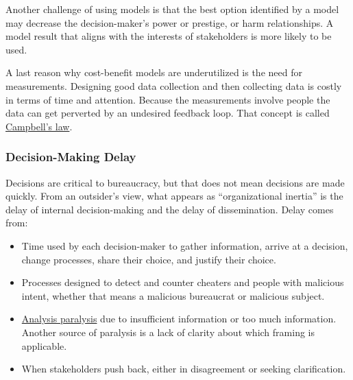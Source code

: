 Another challenge of using models is that the best option identified by a model may decrease the decision-maker's power or prestige, or harm relationships. A model result that aligns with the interests of stakeholders is more likely to be used.

A last reason why cost-benefit models are underutilized is the need for measurements. Designing good data collection and then collecting data is costly in terms of time and attention. Because the measurements involve people the data can get perverted by an undesired feedback loop. That concept is called \href{https://en.wikipedia.org/wiki/Campbell\%27s_law}{Campbell's law}. 

\subsubsection*{Decision-Making Delay\label{sec:decision-delay}}

Decisions are critical to bureaucracy, but that does not mean decisions are made quickly.
From an outsider's view, what appears as ``organizational inertia'' is the delay of internal decision-making and the delay of dissemination. 
Delay comes from:
\begin{itemize}
    \item Time used by each decision-maker to gather information, arrive at a decision, change processes, share their choice, and justify their choice. 
    \item Processes designed to detect and counter cheaters and people with malicious intent, whether that means a malicious bureaucrat or malicious subject. 
\item \href{https://en.wikipedia.org/wiki/Analysis_paralysis}{Analysis paralysis} 
\iftoggle{WPinmargin}{\marginpar{$>$Wikipedia: Analysis paralysis}}{}
due to insufficient information or too much information. Another source  of paralysis is a lack of clarity about which framing is applicable.
\item When stakeholders push back, either in disagreement or seeking clarification. 
\end{itemize}

